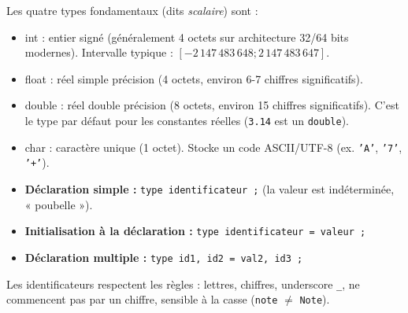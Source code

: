 \documentclass[11pt]{article}
\newcommand{\cle}[1]{{\popxbold\color{popdark}#1}}
\begin{document}
\begin{definition}
Les quatre types fondamentaux (dits \emph{scalaire}) sont :
\begin{itemize}
    \item \cle{int} : entier signé (généralement 4 octets sur architecture 32/64 bits modernes). Intervalle typique : $[-2\,147\,483\,648 ; 2\,147\,483\,647]$.
    \item \cle{float} : réel simple précision (4 octets, environ 6-7 chiffres significatifs).
    \item \cle{double} : réel double précision (8 octets, environ 15 chiffres significatifs). C'est le type par défaut pour les constantes réelles (\texttt{3.14} est un \texttt{double}).
    \item \cle{char} : caractère unique (1 octet). Stocke un code ASCII/UTF-8 (ex. \texttt{'A'}, \texttt{'7'}, \texttt{'+'}).
\end{itemize}
\end{definition}

\begin{propriete}
\begin{itemize}
    \item \textbf{Déclaration simple :} \texttt{type identificateur ;} (la valeur est indéterminée, « poubelle »).
    \item \textbf{Initialisation à la déclaration :} \texttt{type identificateur = valeur ;}
    \item \textbf{Déclaration multiple :} \texttt{type id1, id2 = val2, id3 ;}
\end{itemize}
Les identificateurs respectent les règles : lettres, chiffres, underscore \texttt{\_}, ne commencent pas par un chiffre, sensible à la casse (\texttt{note} $\neq$ \texttt{Note}).
\end{propriete}
\end{document}
